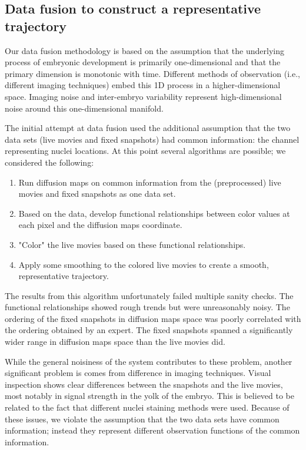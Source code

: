 \documentclass[12pt]{article}
\begin{document}
\subsection{Data fusion to construct a representative trajectory}

Our data fusion methodology is based on the assumption that the underlying process of embryonic development is primarily one-dimensional and that the primary dimension is monotonic with time. Different methods of observation (i.e., different imaging techniques) embed this 1D process in a higher-dimensional space. Imaging noise and inter-embryo variability represent high-dimensional noise around this one-dimensional manifold. \vspace{1mm}

The initial attempt at data fusion used the additional assumption that the two data sets (live movies and fixed snapshots) had common information: the channel representing nuclei locations. At this point several algorithms are possible; we considered the following:

\begin{enumerate}
\item Run diffusion maps on common information from the (preprocessed) live movies and fixed snapshots as one data set.
\item Based on the data, develop functional relationships between color values at each pixel and the diffusion maps coordinate.
\item "Color" the live movies based on these functional relationships.
\item Apply some smoothing to the colored live movies to create a smooth, representative trajectory.
\end{enumerate}

The results from this algorithm unfortunately failed multiple sanity checks. The functional relationships showed rough trends but were unreasonably noisy. The ordering of the fixed snapshots in diffusion maps space was poorly correlated with the ordering obtained by an expert. The fixed snapshots spanned a significantly wider range in diffusion maps space than the live movies did.

While the general noisiness of the system contributes to these problem, another significant problem is comes from difference in imaging techniques. Visual inspection shows clear differences between the snapshots and the live movies, most notably in signal strength in the yolk of the embryo. This is believed to be related to the fact that different nuclei staining methods were used. Because of these issues, we violate the assumption that the two data sets have common information; instead they represent different observation functions of the common information. \vspace{1mm}
\end{document}
